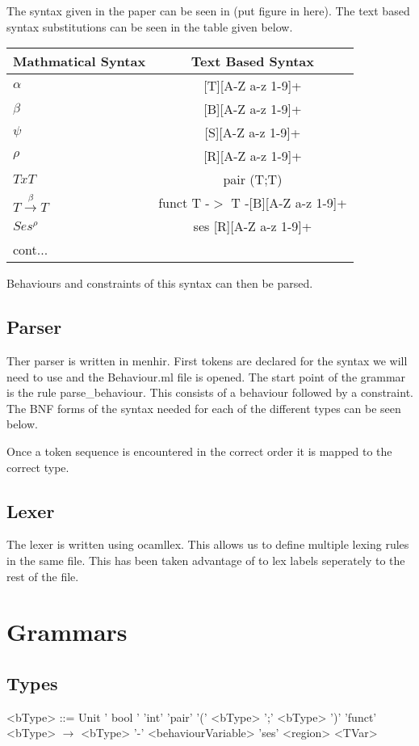 \documentclass[12pt]{article}
\begin{document}
The syntax given in the paper can be seen in (put figure in here). The text based syntax substitutions can be seen in the table given below. 

\begin{tabular}{l c }
Mathmatical Syntax & Text Based Syntax \\
\hline
$\alpha$ & [T][A-Z a-z 1-9]+ \\
$\beta$ & [B][A-Z a-z 1-9]+ \\
$\psi$ & [S][A-Z a-z 1-9]+ \\
$\rho$ & [R][A-Z a-z 1-9]+ \\
$T x T$ & pair (T;T) \\
$ T\overset{\beta}{\rightarrow}T $ & funct T -$>$ T -[B][A-Z a-z 1-9]+ \\
$Ses^\rho$ & ses [R][A-Z a-z 1-9]+ \\
cont...

\end{tabular}

Behaviours and constraints of this syntax can then be parsed. 

\subsection{Parser}

Ther parser is written in menhir. First tokens are declared for the syntax we will need to use and the Behaviour.ml file is opened. The start point of the grammar is the rule parse_behaviour. This consists of a behaviour followed by a constraint. The BNF forms of the syntax needed for each of the different types can be seen below. 

Once a token sequence is encountered in the correct order it is mapped to the correct type. 

\subsection{Lexer}

The lexer is written using ocamllex. This allows us to define multiple lexing rules in the same file. This has been taken advantage of to lex labels seperately to the rest of the file. 

\section {Grammars}

\subsection{Types}
\newpage
\begin{grammar}

<bType> ::= Unit
\alt ' bool '
\alt 'int'
\alt 'pair' '(' <bType> ';' <bType> ')'
\alt 'funct' <bType> $\rightarrow$ <bType> '-' <behaviourVariable>
\alt 'ses' <region>
\alt <TVar>

\end{grammar}
\end{document}
